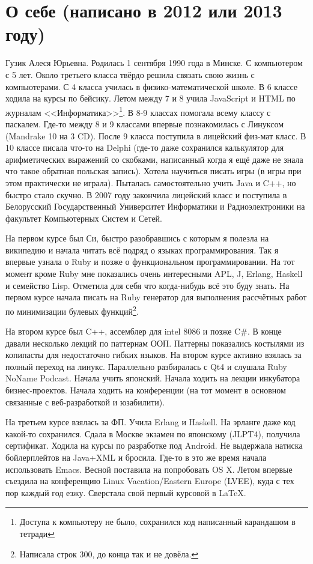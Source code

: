 \documentclass[14pt,a4paper]{extarticle}
\begin{document}
\section*{О себе (написано в 2012 или 2013 году)}

Гузик Алеся Юрьевна. Родилась 1 сентября 1990 года в Минске. С
компьютером с 5 лет. Около третьего класса твёрдо решила связать свою
жизнь с компьютерами. С 4 класса училась в физико-математической
школе. В 6 классе ходила на курсы по бейсику. Летом между 7 и 8
учила JavaScript и HTML по журналам <<Информатика>>\footnote{Доступа
к компьютеру не было, сохранился код написанный карандашом в тетради}.
В 8-9 классах помогала всему классу с паскалем. Где-то между 8 и 9
классами впервые познакомилась с Линуксом (Mandrake 10 на 3 CD).
После 9 класса поступила в лицейский физ-мат класс. В 10 классе писала
что-то на Delphi (где-то даже сохранился калькулятор для
арифметических выражений со скобками, написанный когда я ещё даже не
знала что такое обратная польская запись). Хотела научиться писать игры
(в игры при этом практически не играла). Пыталась самостоятельно учить
Java и C++, но быстро стало скучно. В 2007 году закончила лицейский
класс и поступила в Белорусский Государственный Университет Информатики
и Радиоэлектроники на факультет Компьютерных Систем и Сетей.

На первом курсе был Си, быстро разобравшись с которым я полезла на
википедию и начала читать всё подряд о языках программирования. Так я впервые узнала о
Ruby и позже о функциональном программировании. На тот момент кроме
Ruby мне показались очень интересными APL, J, Erlang, Haskell и
семейство Lisp. Отметила для себя что когда-нибудь всё это буду знать.
На первом курсе начала писать на Ruby генератор для выполнения
рассчётных работ по минимизации булевых функций\footnote{Написала
строк 300, до конца так и не довёла.}.

На втором курсе был C++, ассемблер для intel 8086 и позже C\#. В конце
давали несколько лекций по паттернам ООП. Паттерны показались
костылями из копипасты для недостаточно гибких языков. На втором курсе
активно взялась за полный переход на линукс. Параллельно разбиралась с Qt4
и слушала Ruby NoName Podcast. Начала учить японский. Начала ходить на
лекции инкубатора бизнес-проектов. Начала ходить на конференции (на тот
момент в основном связанные с веб-разработкой и юзабилити).

На третьем курсе взялась за ФП. Учила Erlang и Haskell. На эрланге даже
код какой-то сохранился. Сдала в Москве экзамен по японскому (JLPT4),
получила сертификат. Ходила на курсы по разработке под Android. Не
выдержала натиска бойлерплейтов на Java+XML и бросила. Где-то в это же
время начала использовать Emacs. Весной поставила на попробовать OS X.
Летом впервые съездила на конференцию Linux Vacation/Eastern Europe
(LVEE), куда с тех пор каждый год езжу. Сверстала свой первый курсовой
в \LaTeX.
\end{document}
